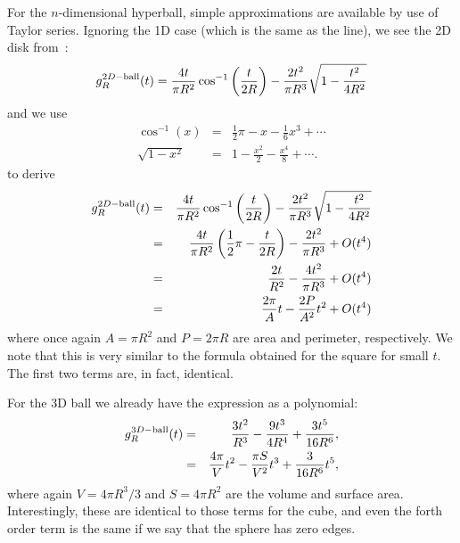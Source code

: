 For the $n$-dimensional hyperball, simple approximations are available
by use of Taylor series. Ignoring the 1D case (which is the same as
the line), we see the 2D disk
from~\cite{tu00:_circle_line,weisstein:_circle_line_picking}: 
\[
   g^{2D-{\rm ball}}_R(t) 
     =  \frac{4 t}{\pi R^2} \cos^{-1} \left( \frac{t}{2R} \right) 
               - \frac{2 t^2}{\pi R^3} \sqrt{1 - \frac{t^2}{4 R^2} }          
\]
and we use
\begin{eqnarray*}
  \cos^{-1}(x)  & = & \frac{1}{2} \pi - x - \frac{1}{6} x^{3} + \cdots \\
  \sqrt{1 - x^2} & = & 1 - \frac{x^2}{2} - \frac{x^4}{8}  + \cdots.
\end{eqnarray*}
to derive
\begin{eqnarray}
  g^{2D-{\rm ball}}_R(t) 
         & = & \frac{4 t}{\pi R^2} \cos^{-1} \left( \frac{t}{2R} \right) 
               - \frac{2 t^2}{\pi R^3} \sqrt{1 - \frac{t^2}{4 R^2} }
               \nonumber \\
         & = & \frac{4 t}{\pi R^2} \left( \frac{1}{2} \pi - \frac{t}{2R} \right)
                   -  \frac{2 t^2}{\pi R^3} + O(t^4)  \nonumber \\
         & = &  \frac{2 t}{R^2} -  \frac{4 t^2}{\pi R^3}  + O(t^4) \nonumber \\
         & = &  \frac{2 \pi}{A} t -  \frac{2 P}{A^2} t^2 + O(t^4) 
\end{eqnarray}
where once again $A=\pi R^2$ and $P = 2 \pi R$ are area and perimeter,
respectively. We note that this is very similar to the formula
obtained for the square for small $t$. The first two terms are, in
fact, identical.

For the 3D ball we already have the expression as a polynomial:
\begin{eqnarray}
  g^{3D-{\rm ball}}_R(t) 
        & = & \frac{3 t^2}{R^3} - \frac{9 t^3}{4 R^4} + \frac{3 t^5}{16 R^6}  \nonumber , \\
        & = & \frac{4 \pi}{V} t^2 - \frac{\pi S}{V^2} t^3 + \frac{3}{16 R^6} t^5,
\end{eqnarray}
where again $V=4 \pi R^3/3$ and $S = 4 \pi R^2$ are the volume and
surface area. Interestingly, these are identical to those terms for
the cube, and even the forth order term is the same if we say that the
sphere has zero edges.


